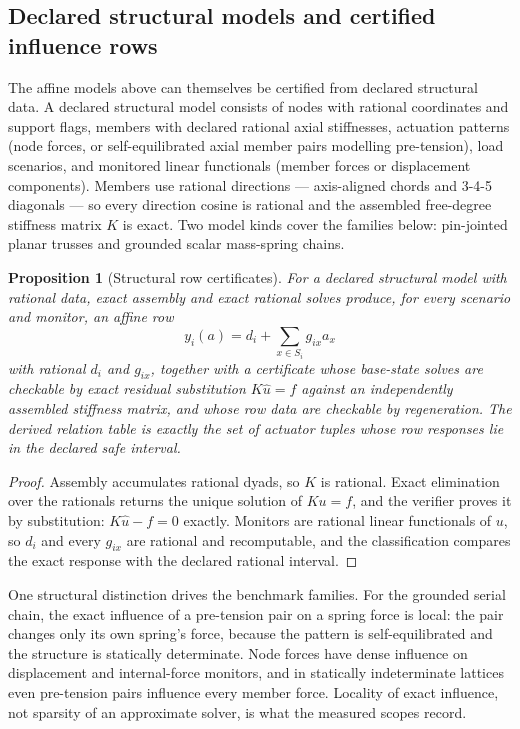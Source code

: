 \documentclass[11pt]{article}
\theoremstyle{plain}
\newtheorem{proposition}[theorem]{Proposition}
\theoremstyle{definition}
\theoremstyle{remark}
\begin{document}
\subsection{Declared structural models and certified influence rows}
\label{subsec:structural-front-end}

The affine models above can themselves be certified from declared structural
data.  A declared structural model consists of nodes with rational
coordinates and support flags, members with declared rational axial
stiffnesses, actuation patterns (node forces, or self-equilibrated axial
member pairs modelling pre-tension), load scenarios, and monitored linear
functionals (member forces or displacement components).  Members use rational
directions --- axis-aligned chords and 3-4-5 diagonals --- so every direction
cosine is rational and the assembled free-degree stiffness matrix \(K\) is
exact.  Two model kinds cover the families below: pin-jointed planar trusses
and grounded scalar mass-spring chains.

\begin{proposition}[Structural row certificates]
\label{prop:structural-row-certificates}
For a declared structural model with rational data, exact assembly and exact
rational solves produce, for every scenario and monitor, an affine row
\[
  y_i(a)=d_i+\sum_{x\in S_i}g_{ix}a_x
\]
with rational \(d_i\) and \(g_{ix}\), together with a certificate whose
base-state solves are checkable by exact residual substitution
\(K\widehat u=f\) against an independently assembled stiffness matrix, and
whose row data are checkable by regeneration.  The derived relation table is
exactly the set of actuator tuples whose row responses lie in the declared
safe interval.
\end{proposition}

\begin{proof}
Assembly accumulates rational dyads, so \(K\) is rational.  Exact
elimination over the rationals returns the unique solution of \(Ku=f\), and
the verifier proves it by substitution: \(K\widehat u-f=0\) exactly.
Monitors are rational linear functionals of \(u\), so \(d_i\) and every
\(g_{ix}\) are rational and recomputable, and the classification compares
the exact response with the declared rational interval.
\end{proof}

One structural distinction drives the benchmark families.  For the grounded
serial chain, the exact influence of a pre-tension pair on a spring force is
local: the pair changes only its own spring's force, because the pattern is
self-equilibrated and the structure is statically determinate.  Node forces
have dense influence on displacement and internal-force monitors, and in
statically indeterminate lattices even pre-tension pairs influence every
member force.  Locality of exact influence, not sparsity of an approximate
solver, is what the measured scopes record.
\end{document}
